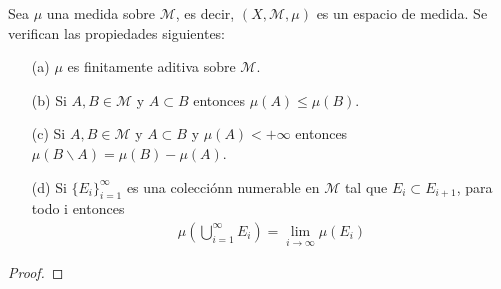 \begin{prop}
Sea $\mu$ una medida sobre $\mathcal{M}$, es decir, $(X, \mathcal{M}, \mu)$ es un espacio de medida. Se verifican las propiedades siguientes:
\begin{enumerate}
    \item[(a)] $\mu$ es finitamente aditiva sobre $\mathcal{M}$.
    \item[(b)] Si $A, B \in \mathcal{M}$ y $A \subset B$ entonces $\mu(A) \leq \mu(B)$.
    \item[(c)] Si $A, B \in \mathcal{M}$ y $A \subset B$ y $\mu(A) < +\infty$ entonces $\mu(B \backslash A) = \mu(B) - \mu(A)$.
    \item[(d)] Si  $\{ E_i \}_{i=1}^{\infty}$ es una colecciónn numerable en $\mathcal{M}$ tal que $E_i \subset E_{i+1}$, para todo i entonces
    \begin{align*}
        \mu \left( \bigcup_{i=1}^{\infty}{E_i} \right) = \lim_{i \to \infty}{\mu(E_i)}
    \end{align*}
\end{enumerate}
\end{prop}
\begin{proof}

\end{proof}

